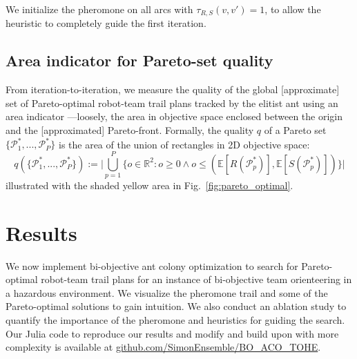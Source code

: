 \documentclass[11pt, oneside]{article}
\begin{document}
We initialize the pheromone on all arcs with $\tau_{R,S}(v, v\prime)=1$, to allow the heuristic to completely guide the first iteration. 




\subsection{Area indicator for Pareto-set quality}
From iteration-to-iteration, we measure the quality of the global [approximate] set of Pareto-optimal robot-team trail plans tracked by the elitist ant using an area indicator \cite{cao2015using,guerreiro2020hypervolume}---loosely, the area in objective space enclosed between the origin and the [approximated] Pareto-front. Formally, the quality $q$ of a Pareto set $\{\mathcal{P}^*_1, ...,\mathcal{P}^*_P\}$ is the area of the union of rectangles in 2D objective space:
\begin{equation}
	q(\{\mathcal{P}^*_1, ...,\mathcal{P}^*_{P}\}):=
	\Big \lvert 
		\bigcup_{p=1}^P \{ o \in \mathbb{R}^2 : o \geq 0 \wedge  o \leq (\mathbb{E}[R(\mathcal{P}^*_p)], \mathbb{E}[S(\mathcal{P}^*_p)]) \} 
	\Big \rvert \label{eq:q}
\end{equation}
illustrated with the shaded yellow area in Fig.~\ref{fig:pareto_optimal}.

\section{Results}
We now implement bi-objective ant colony optimization to search for Pareto-optimal robot-team trail plans for an instance of bi-objective team orienteering in a hazardous environment. 
We visualize the pheromone trail and some of the Pareto-optimal solutions to gain intuition. We also conduct an ablation study to quantify the importance of the pheromone and heuristics for guiding the search.
Our Julia code to reproduce our results and modify and build upon with more complexity is available at \url{github.com/SimonEnsemble/BO_ACO_TOHE}.
\end{document}
